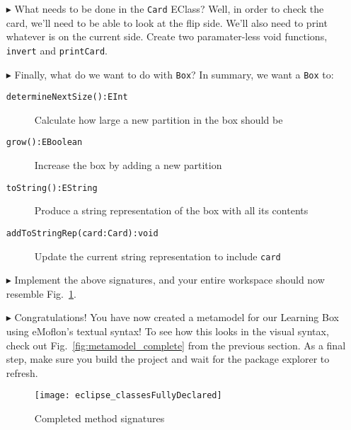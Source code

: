\begin{itemize}
\vspace{0.5cm}

\item[$\blacktriangleright$] What needs to be done in the \texttt{Card} EClass? Well, in order to check the card, we'll need to be able to look at the flip
side. We'll also need to print whatever is on the current side. Create two paramater-less void functions, \texttt{invert} and \texttt{printCard}. 

\item[$\blacktriangleright$] Finally, what do we want to do with \texttt{Box}? In summary, we want a \texttt{Box} to:

\begin{description}
  \item[\texttt{determineNextSize():EInt}] Calculate how large a new partition in the box should be
  \item[\texttt{grow():EBoolean}] Increase the box by adding a new partition
  \item[\texttt{toString():EString}] Produce a string representation of the box with all its contents
  \item[\texttt{addToStringRep(card:Card):void}] Update the current string representation to include \texttt{card}
\end{description}

\item[$\blacktriangleright$] Implement the above signatures, and your entire workspace should now resemble Fig.~\ref{fig:workspaceMethods}.

\item[$\blacktriangleright$] Congratulations! You have now created a metamodel for our Learning Box using eMoflon's textual syntax! To see how
this looks in the visual syntax, check out Fig.~\ref{fig:metamodel_complete} from the previous section. As a final step, make sure you build the project and
wait for the package explorer to refresh. 

\newpage


\begin{figure}[htbp]
	\centering
  \texttt{[image: eclipse\_classesFullyDeclared]}
	\caption{Completed method signatures}
	\label{fig:workspaceMethods}
\end{figure}
\FloatBarrier

\end{itemize}